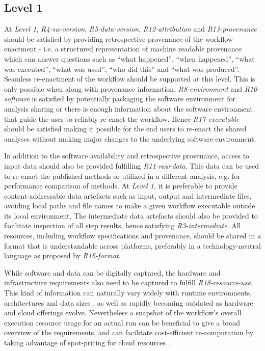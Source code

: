 \documentclass[a4paper,num-refs]{oup-contemporary}
\begin{document}
\subsection{Level 1} \label{sec:level1}
At \textit{Level 1}, \textit{R4-sw-version}, \textit{R5-data-version}, \textit{R12-attribution} and \textit{R13-provenance} should be satisfied by providing retrospective provenance of the workflow enactment - i.e. a structured representation of machine readable provenance which can answer questions such as ``what happened'', ``when happened'', ``what was executed'', ``what was used'', ``who did this'' and ``what was produced''. Seamless re-enactment of the workflow should be supported at this level. This is only possible when along with provenance information, \textit{R8-environment} and \textit{R10-software} is satisfied by potentially packaging the software environment for analysis sharing or there is enough information about the software environment that guide the user to reliably re-enact the workflow. Hence \textit{R17-executable} should be satisfied making it possible for the end users to re-enact the shared analyses without making major changes to the underlying software environment. 

In addition to the software availability and retrospective provenance, access to input data should also be provided fulfilling \textit{R11-raw-data}. This data can be used to re-enact the published methods or utilized in a different analysis, e.g. for performance comparison of methods. At \textit{Level 1}, it is preferable to provide content-addressable data artefacts such as input, output and intermediate files, avoiding local paths and file names to make a given workflow executable outside its local environment. The intermediate data artefacts should also be provided to facilitate inspection of all step results, hence satisfying \textit{R3-intermediate}. All resources, including workflow specifications and provenance, should be shared in a format that is understandable across platforms, preferably in a technology-neutral language as proposed by \textit{R16-format}.

While software and data can be digitally captured, the hardware and infrastructure requirements also need to be captured to fulfill \textit{R18-resource-use}. This kind of information can naturally vary widely with runtime environments, architectures and data sizes \citep{Bubak_2013}, as well as rapidly becoming outdated as hardware and cloud offerings evolve. Nevertheless a snapshot of the workflow's overall execution resource usage for an actual run can be beneficial to give a broad overview of the requirements, and can facilitate cost-efficient re-computation by taking advantage of spot-pricing for cloud resources \citep{Angiuoli_2011}.
\end{document}
